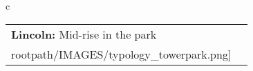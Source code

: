 \begin{table}[H]
        \begin{tabular}{c}
        \begin{tabular}{m{1.5in} m{2in}}
\textbf{Lincoln:} {Mid-rise in the park} & \texttt{[image: \\rootpath/IMAGES/typology\_towerpark.png]}
\end{tabular}\end{tabular}
        \end{table}